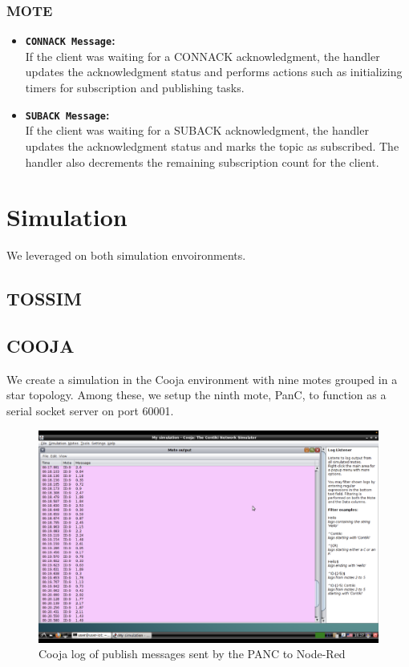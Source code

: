 \documentclass[11pt]{article}
\begin{document}
\subsubsection*{MOTE}
\begin{itemize}
\item{\textbf{\texttt{CONNACK Message}:}}\\
If the client was waiting for a CONNACK acknowledgment, the handler updates the acknowledgment status and performs actions such as initializing timers for subscription and publishing tasks.
\item{\textbf{\texttt{SUBACK Message}:}}\\
If the client was waiting for a SUBACK acknowledgment, the handler updates the acknowledgment status and marks the topic as subscribed.
The handler also decrements the remaining subscription count for the client.
\end{itemize}
\section*{Simulation}
We leveraged on both simulation envoironments.
\subsection*{TOSSIM}

\subsection*{COOJA}
We create a simulation in the Cooja environment with nine motes grouped in a star topology. 
Among these, we setup the ninth mote, PanC, to function as a serial socket server on port 60001. 

\begin{figure}[h]
  \includegraphics[width=1\textwidth]{images/publish_messages_cooja.png}
  \caption{Cooja log of publish messages sent by the PANC to Node-Red}
\end{figure}
\end{document}
